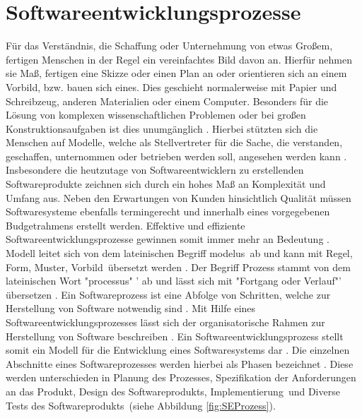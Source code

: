 \section{Softwareentwicklungsprozesse}\label{sec:chapter.2: Softwareentwicklungsprozesse}

Für das Verständnis, die Schaffung oder Unternehmung von etwas Großem, fertigen Menschen in der Regel ein vereinfachtes Bild davon an. Hierfür nehmen sie Maß, fertigen eine Skizze oder einen Plan an oder orientieren sich an einem Vorbild, bzw. bauen sich eines. Dies geschieht normalerweise mit Papier und Schreibzeug, anderen Materialien oder einem Computer. Besonders für die Lösung von komplexen wissenschaftlichen Problemen oder bei großen Konstruktionsaufgaben ist dies unumgänglich \cite{Hesse2008}. \newline
Hierbei stützten sich die Menschen auf Modelle, welche als Stellvertreter für die Sache, die verstanden, geschaffen, unternommen oder betrieben werden soll, angesehen werden kann \cite{Hesse2008}. \newline
Insbesondere die heutzutage von Softwareentwicklern zu erstellenden Softwareprodukte zeichnen sich durch ein hohes Maß an Komplexität und Umfang aus. Neben den Erwartungen von Kunden hinsichtlich Qualität müssen Softwaresysteme ebenfalls termingerecht und innerhalb eines vorgegebenen Budgetrahmens erstellt werden. Effektive und effiziente Softwareentwicklungsprozesse gewinnen somit immer mehr an Bedeutung \cite{Grechenig2010}.
Modell leitet sich von dem lateinischen Begriff  \glqq modelus\grqq \ 
ab und kann mit  \grqq Regel, Form, Muster, Vorbild\grqq \ übersetzt werden \cite{Hesse2008}. 
Der Begriff Prozess stammt von dem lateinischen Wort "processus" ' ab und lässt sich mit "Fortgang oder Verlauf"' übersetzen \cite{koch2011, Staud2006}. \newline 
Ein Softwareprozess ist eine Abfolge von Schritten, welche zur Herstellung von Software notwendig sind \cite{Mishra2012, Stoerrle2005}. Mit Hilfe eines Softwareentwicklungsprozesses lässt sich der organisatorische Rahmen zur Herstellung von Software beschreiben \cite{Koelmel2000}. Ein Softwareentwicklungsprozess stellt somit ein Modell für die Entwicklung eines Softwaresystems dar \cite{Hanser2010}. Die einzelnen Abschnitte eines Softwareprozesses werden hierbei als Phasen bezeichnet \cite{Stoerrle2005}. Diese werden unterschieden in  \grqq Planung des Prozesses\grqq,  \grqq Spezifikation der Anforderungen an das Produkt\grqq ,  \grqq Design des Softwareprodukts\grqq,  \grqq Implementierung\grqq \ und  \grqq Diverse Tests des Softwareprodukts\grqq \ (siehe Abbildung \ref{fig:SEProzess}).

